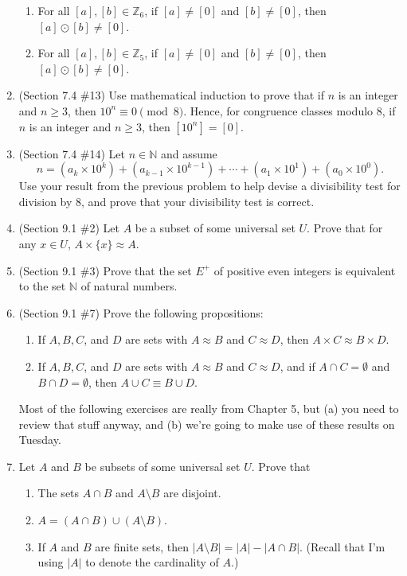 \documentclass[letterpaper,12pt]{article}
\newcommand{\Z}{\mathbb{Z}}
\begin{document}
\begin{enumerate}
\begin{enumerate}
 \item For all $[a], [b]\in\Z_6$, if $[a]\neq [0]$ and $[b]\neq [0]$, then $[a]\odot [b] \neq [0]$.
 \item For all $[a], [b]\in\Z_5$, if $[a]\neq [0]$ and $[b]\neq [0]$, then $[a]\odot [b] \neq [0]$.
\end{enumerate}
\item (Section 7.4 \#13) Use mathematical induction to prove that if $n$ is an integer and $n\geq 3$, then $10^n\equiv 0\pmod{8}$. Hence, for congruence classes modulo 8, if $n$ is an integer and $n\geq 3$, then $[10^n]=[0]$.
\item (Section 7.4 \#14) Let $n\in \mathbb{N}$ and assume
\[
 n = (a_k\times 10^k)+(a_{k-1}\times 10^{k-1})+\cdots + (a_1\times 10^1)+(a_0\times 10^0).
\]
Use your result from the previous problem to help devise a divisibility test for division by 8, and prove that your divisibility test is correct.
\item (Section 9.1 \#2) Let $A$ be a subset of some universal set $U$. Prove that for any $x\in U$, $A\times\{x\}\approx A$.
\item (Section 9.1 \#3) Prove that the set $E^+$ of positive even integers is equivalent to the set $\mathbb{N}$ of natural numbers.
\item (Section 9.1 \#7) Prove the following propositions:
\begin{enumerate}
 \item If $A, B, C$, and $D$ are sets with $A\approx B$ and $C\approx D$, then $A\times C\approx B\times D$.
 \item If $A, B, C$, and $D$ are sets with $A\approx B$ and $C\approx D$, and if $A\cap C = \emptyset$ and $B\cap D=\emptyset$, then $A\cup C\equiv B\cup D$.
\end{enumerate}
Most of the following exercises are really from Chapter 5, but (a) you need to review that stuff anyway, and (b) we're going to make use of these results on Tuesday.
\item Let $A$ and $B$ be subsets of some universal set $U$. Prove that
\begin{enumerate}
 \item The sets $A\cap B$ and $A\setminus B$ are disjoint.
 \item $A = (A\cap B)\cup (A\setminus B)$.
 \item If $A$ and $B$ are finite sets, then $|A\setminus B| = |A|-|A\cap B|$. (Recall that I'm using $|A|$ to denote the cardinality of $A$.)
\end{enumerate}

\end{enumerate}
\end{document}
